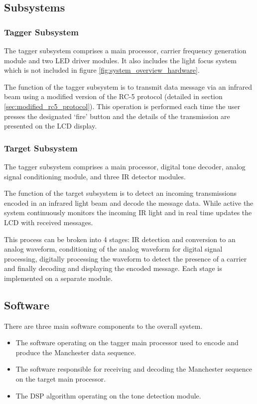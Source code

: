 \subsection{Subsystems}

\subsubsection{Tagger Subsystem}

The tagger subsystem comprises a main processor, carrier frequency generation module and two LED driver modules. It also includes the light focus system which is not included in figure \ref{fig:system_overview_hardware}.

The function of the tagger subsystem is to transmit data message via an infrared beam using a modified version of the RC-5 protocol (detailed in section \ref{sec:modified_rc5_protocol}). This operation is performed each time the user presses the designated `fire' button and the details of the transmission are presented on the LCD display.


\subsubsection{Target Subsystem}

The tagger subsystem comprises a main processor, digital tone decoder, analog signal conditioning module, and three IR detector modules.

The function of the target subsystem is to detect an incoming transmissions encoded in an infrared light beam and decode the message data. While active the system continuously monitors the incoming IR light and in real time updates the LCD with received messages.

This process can be broken into 4 stages: IR detection and conversion to an analog waveform, conditioning of the analog waveform for digital signal processing, digitally processing the waveform to detect the presence of a carrier and finally decoding and displaying the encoded message. Each stage is implemented on a separate module.

\subsection{Software}

There are three main software components to the overall system.
\begin{itemize}
	\item The software operating on the tagger main processor used to encode and produce the Manchester data sequence.
	\item The software responsible for receiving and decoding the Manchester sequence on the target main processor.
	\item  The DSP algorithm operating on the tone detection module.
\end{itemize}






